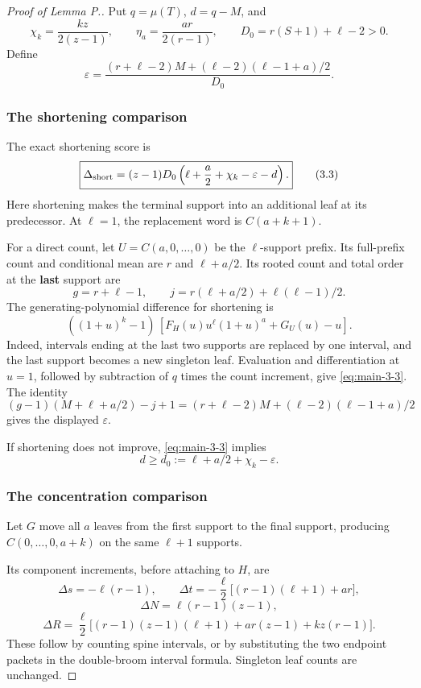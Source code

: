 \documentclass[11pt,letterpaper]{article}
\theoremstyle{plain}
\begin{document}
\begin{proof}[Proof of Lemma P.]

Put \(q=\mu(T)\), \(d=q-M\), and \[
\chi_k=\frac{kz}{2(z-1)},\qquad
\eta_a=\frac{ar}{2(r-1)},\qquad
D_0=r(S+1)+\ell-2>0.
\] Define \[
\varepsilon=
\frac{(r+\ell-2)M+(\ell-2)(\ell-1+a)/2}{D_0}.
\tag{3.2}\label{eq:main-3-2}
\]

\subsubsection*{The shortening comparison}\label{the-shortening-comparison}

The exact shortening score is \[
\boxed{
\Delta_{\rm short}
=(z-1)D_0\left(\ell+\frac a2+\chi_k-\varepsilon-d\right).
}
\tag{3.3}\label{eq:main-3-3}
\] Here shortening makes the terminal support into an additional leaf at its predecessor. At \(\ell=1\), the replacement word is \(C(a+k+1)\).

For a direct count, let \(U=C(a,0,\ldots,0)\) be the \(\ell\)-support prefix. Its full-prefix count and conditional mean are \(r\) and \(\ell+a/2\). Its rooted count and total order at the \textbf{last} support are \[
g=r+\ell-1,\qquad j=r(\ell+a/2)+\ell(\ell-1)/2.
\] The generating-polynomial difference for shortening is \[
((1+u)^k-1)\,[F_H(u)u^{\ell}(1+u)^a+G_U(u)-u].
\] Indeed, intervals ending at the last two supports are replaced by one interval, and the last support becomes a new singleton leaf. Evaluation and differentiation at \(u=1\), followed by subtraction of \(q\) times the count increment, give \eqref{eq:main-3-3}. The identity \[
(g-1)(M+\ell+a/2)-j+1
=(r+\ell-2)M+(\ell-2)(\ell-1+a)/2
\] gives the displayed \(\varepsilon\).

If shortening does not improve, \eqref{eq:main-3-3} implies \[
d\ge d_0:=\ell+a/2+\chi_k-\varepsilon.
\tag{3.4}\label{eq:main-3-4}
\]

\subsubsection*{The concentration comparison}\label{the-concentration-comparison}

Let \(G\) move all \(a\) leaves from the first support to the final support, producing \(C(0,\ldots,0,a+k)\) on the same \(\ell+1\) supports.

Its component increments, before attaching to \(H\), are \[
\Delta s=-\ell(r-1),\qquad
\Delta t=-\frac{\ell}{2}\bigl[(r-1)(\ell+1)+ar\bigr],
\] \[
\Delta N=\ell(r-1)(z-1),
\] \[
\Delta R=\frac{\ell}{2}
\bigl[(r-1)(z-1)(\ell+1)+ar(z-1)+kz(r-1)\bigr].
\tag{3.5}\label{eq:main-3-5}
\] These follow by counting spine intervals, or by substituting the two endpoint packets in the double-broom interval formula. Singleton leaf counts are unchanged.


\end{proof}
\end{document}
